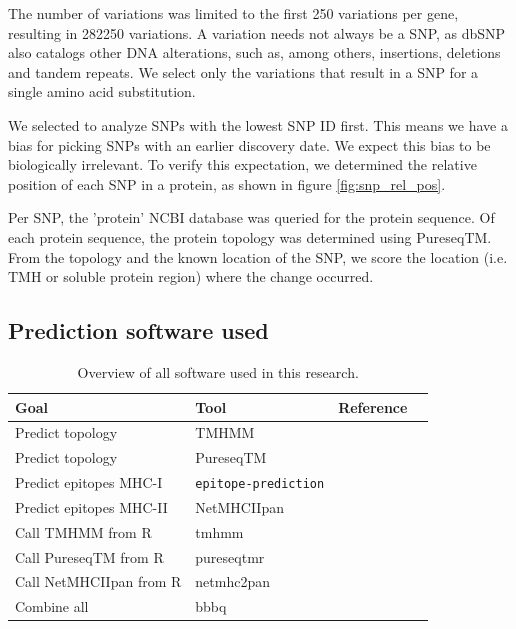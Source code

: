 The number of variations
was limited to the first 250 variations per gene,
resulting in 282250 variations. 
A variation needs not always be a SNP,
as dbSNP also catalogs other DNA alterations, such as, among others, insertions,
deletions and tandem repeats.
We select only the variations that result in a SNP for
a single amino acid substitution.

%
We selected to analyze SNPs with the lowest SNP ID first.
This means we have a bias for picking SNPs with
an earlier discovery date.
We expect this bias to be biologically irrelevant.
To verify this expectation, we determined the
relative position of each SNP in a protein,
as shown in figure \ref{fig:snp_rel_pos}.

Per SNP, the 'protein' NCBI database was queried for the
protein sequence.
Of each protein sequence, the protein topology was determined 
using PureseqTM.
From the topology and the known location of the SNP, 
we score the location (i.e. TMH or soluble protein region) 
where the change occurred.


\subsection{Prediction software used}
\label{subsec:prediction_software_used}

\begin{table}[]
  \begin{tabular}{llll}
    Goal & Tool & Reference \\ 
    \hline
    Predict topology                  & TMHMM                     & \cite{krogh2001predicting} \\
    Predict topology                  & PureseqTM                 & \cite{wang2019efficient} \\
    Predict epitopes MHC-I            & \verb;epitope-prediction; & \cite{bianchi2017} \\
    Predict epitopes MHC-II           & NetMHCIIpan               & \cite{nielsen2008quantitative,karosiene2013netmhciipan} \\
    Call TMHMM from R                 & tmhmm                     & \cite{tmhmm} \\
    Call PureseqTM from R             & pureseqtmr                & \cite{pureseqtmr} \\
    Call NetMHCIIpan from R           & netmhc2pan                & \cite{netmhc2pan} \\
    Combine all                       & bbbq                      & \cite{bbbq}
  \end{tabular}
  \caption{
    Overview of all software used in this research.
  }
  \label{table:software_used}
\end{table}


